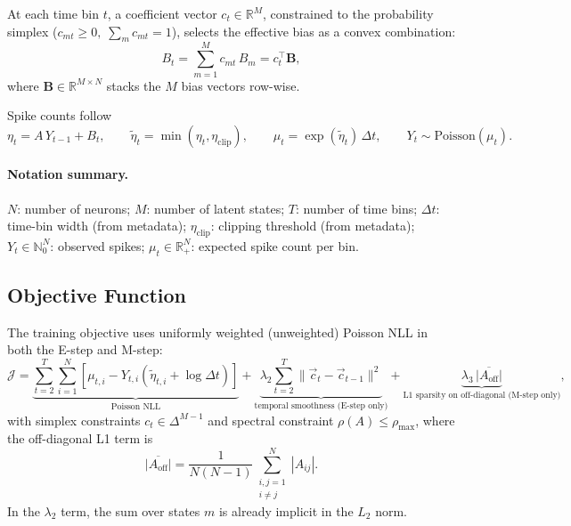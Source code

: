 \documentclass[11pt]{article}
\begin{document}
At each time bin \(t\), a coefficient vector
\(c_t \in \mathbb{R}^M\), constrained to the probability simplex
(\(c_{mt}\ge 0,\; \sum_m c_{mt}=1\)), selects the effective bias as a
convex combination:
\begin{equation}
  B_t = \sum_{m=1}^{M} c_{mt}\, B_m = c_t^\top \mathbf{B},
\end{equation}
where \(\mathbf{B} \in \mathbb{R}^{M \times N}\) stacks the \(M\) bias
vectors row-wise.

Spike counts follow
\begin{equation}
  \eta_t = A\,Y_{t-1} + B_t,\qquad
  \tilde{\eta}_t = \min(\eta_t,\eta_{\mathrm{clip}}),\qquad
  \mu_t = \exp(\tilde{\eta}_t)\,\Delta t,\qquad
  Y_t \sim \mathrm{Poisson}(\mu_t).
  \label{eq:glm}
\end{equation}

\paragraph{Notation summary.}
\(N\): number of neurons; 
\(M\): number of latent states; 
\(T\): number of time bins;
\(\Delta t\): time-bin width (from metadata);
\(\eta_{\mathrm{clip}}\): clipping threshold (from metadata);
\(Y_t \in \mathbb{N}_0^N\): observed spikes;
\(\mu_t \in \mathbb{R}_+^N\): expected spike count per bin.

\subsection{Objective Function}

The training objective uses uniformly weighted (unweighted) Poisson NLL in both the E-step and M-step:
\begin{equation}
\mathcal{J}
=
\underbrace{\sum_{t=2}^{T}\sum_{i=1}^{N}
\left[\mu_{t,i}-Y_{t,i}\left(\tilde{\eta}_{t,i}+\log\Delta t\right)\right]}_{\text{Poisson NLL}}
+
\underbrace{\lambda_2\sum_{t=2}^{T}\|\vec c_t- \vec c_{t-1}\|^2}_{\text{temporal smoothness (E-step only)}}
+
\underbrace{\lambda_3\,\overline{|A_{\mathrm{off}}|}}_{\text{L1 sparsity on off-diagonal (M-step only)}},
\label{eq:objective}
\end{equation}
with simplex constraints \(c_t\in\Delta^{M-1}\) and spectral constraint
\(\rho(A)\le \rho_{\max}\), where the off-diagonal L1 term is
\begin{equation}
  \overline{|A_{\mathrm{off}}|}
  =
  \frac{1}{N(N-1)}
  \sum_{\substack{i,j=1\\i\neq j}}^{N}|A_{ij}|.
  \label{eq:l1_offdiag}
\end{equation}
In the $\lambda_2$ term, the sum over states $m$
is already implicit in the $L_2$ norm.
\end{document}
